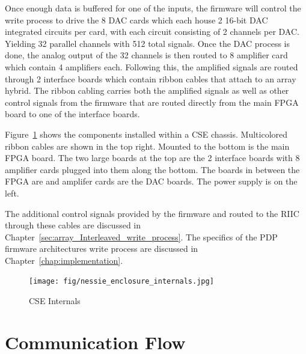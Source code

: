    Once enough data is buffered for one of the inputs, the firmware will control the write process to drive the 8 DAC cards which each house 2 16-bit DAC integrated circuits per card, with each circuit consisting of 2 channels per DAC. Yielding 32 parallel channels with 512 total signals. Once the DAC process is done, the analog output of the 32 channels is then routed to 8 amplifier card which contain 4 amplifiers each. Following this, the amplified signals are routed through 2 interface boards which contain ribbon cables that attach to an array hybrid. The ribbon cabling carries both the amplified signals as well as other control signals from the firmware that are routed directly from the main FPGA board to one of the interface boards.

    Figure~\ref{fig:nessie_enclosure_internals} shows the components installed within a CSE chassis. Multicolored ribbon cables are shown in the top right. Mounted to the bottom is the main FPGA board. The two large boards at the top are the 2 interface boards with 8 amplifier cards plugged into them along the bottom. The boards in between the FPGA are and amplifer cards are the DAC boards. The power supply is on the left.

    The additional control signals provided by the firmware and routed to the RIIC through these cables are discussed in Chapter~\ref{sec:array_Interleaved_write_process}. The specifics of the PDP firmware architectures write process are discussed in Chapter~\ref{chap:implementation}.

    \begin{figure}
        \centering
        \texttt{[image: fig/nessie\_enclosure\_internals.jpg]}
        \caption{CSE Internals}
        \label{fig:nessie_enclosure_internals}
    \end{figure}

\section{Communication Flow}

